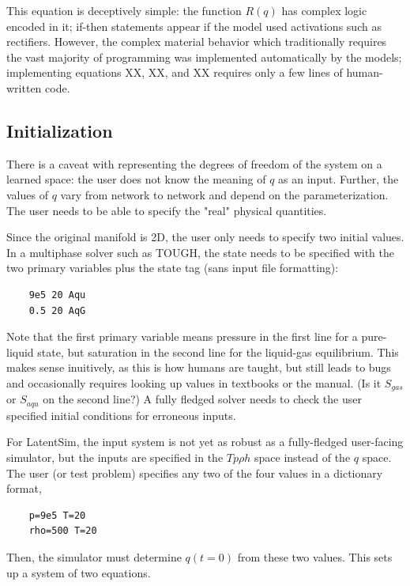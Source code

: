 \documentclass[]{article}
\begin{document}
This equation is deceptively simple: the function \(R(q)\) has complex logic encoded in it; if-then
statements appear if the model used activations such as rectifiers.
However, the complex material behavior which traditionally requires
the vast majority of programming was implemented automatically by the
models; implementing equations XX, XX, and XX requires only a few lines
of human-written code. 

\hypertarget{header-n3339}{%
\subsection{Initialization}\label{header-n3339}}

There is a caveat with representing the degrees of freedom of the system
on a learned space: the user does not know the meaning of \(q\) as an
input. Further, the values of \(q\) vary from network to network and
depend on the parameterization. The user needs to be able to specify the
"real" physical quantities.

Since the original manifold is 2D, the user only needs to specify two
initial values. In a multiphase solver such as TOUGH, the state needs
to be specified with the two primary variables plus the state tag (sans input file formatting): 
\begin{verbatim}
    9e5 20 Aqu
    0.5 20 AqG
\end{verbatim}
Note that the first primary variable means pressure in the first line
for a pure-liquid state,
but saturation in the second line for the liquid-gas equilibrium.
This makes sense inuitively, as this is how humans are taught, but
still leads to bugs and occasionally requires looking up values in
textbooks or the manual. (Is it $S_{gas}$ or $S_{aqu}$ on the second
line?) A fully fledged solver needs to check the user specified
initial conditions for erroneous inputs.

For LatentSim, the input system is not yet as robust as a
fully-fledged user-facing simulator, but the inputs are specified in
the $T p \rho h$ space instead of the $q$ space.
The user (or test problem) specifies any two of the four values in a
dictionary format,
\begin{verbatim}
    p=9e5 T=20
    rho=500 T=20
\end{verbatim}
Then, the simulator must determine $q(t=0)$ from these two
values. This sets up a system of two equations.
\end{document}
